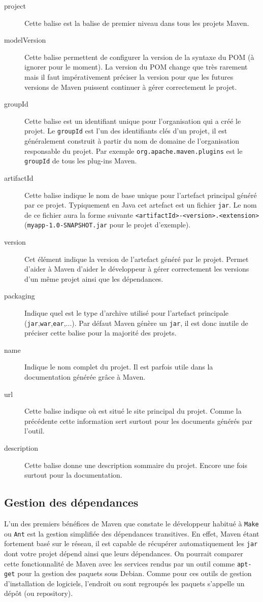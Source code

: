 \documentclass[a4paper,11pt]{article}
\begin{document}
\begin{description}
  \item[project] Cette balise est la balise de premier niveau dans tous les projets Maven.
  \item[modelVersion] Cette balise permettent de configurer la version de la syntaxe du POM (à ignorer pour le moment). 
  La version du POM change que très rarement mais il faut impérativement préciser la version pour que les futures versions
  de Maven puissent continuer à gérer correctement le projet.
  \item[groupId] Cette balise est un identifiant unique pour l'organisation qui a créé le projet. Le \texttt{groupId} est l'un 
  des identifiants clés d'un projet, il est généralement construit à partir du nom de domaine de l'organisation 
  responsable du projet. Par exemple \texttt{org.apache.maven.plugins} est le \texttt{groupId} de tous les plug-ins Maven.
  \item[artifactId] Cette balise indique le nom de base unique pour l'artefact principal généré par ce projet. 
  Typiquement en Java cet artefact est un fichier \texttt{jar}. Le nom de ce fichier aura la forme suivante 
  \texttt{<artifactId>-<version>.<extension>} (\texttt{myapp-1.0-SNAPSHOT.jar} pour le projet d'exemple).
  \item[version] Cet élément indique la version de l'artefact généré par le projet. Permet d'aider à Maven d'aider le 
  développeur à gérer correctement les versions d'un même projet ainsi que les dépendances.
  \item[packaging] Indique quel est le type d'archive utilisé pour l'artefact principale (\texttt{jar},\texttt{war},\texttt{ear},...). 
  Par défaut Maven génère un \texttt{jar}, il est donc inutile de préciser cette balise pour la majorité des projets.
  \item[name] Indique le nom complet du projet. Il est parfois utile dans la documentation générée grâce à Maven.
  \item[url] Cette balise indique où est situé le site principal du projet. Comme la précédente cette information sert 
  surtout pour les documents générés par l'outil.
  \item[description] Cette balise donne une description sommaire du projet. Encore une fois surtout pour la documentation.
\end{description}

\subsection{Gestion des dépendances}
L'un des premiers bénéfices de Maven que constate le développeur habitué à \texttt{Make} ou \texttt{Ant} est la gestion 
simplifiée des dépendances transitives. En effet, Maven étant fortement basé sur le réseau, il est capable de récupérer 
automatiquement les \texttt{jar} dont votre projet dépend ainsi que leurs dépendances. On pourrait comparer cette 
fonctionnalité de Maven avec les services rendus par un outil comme \texttt{apt-get} pour la gestion des paquets sous 
Debian. Comme pour ces outils de gestion d'installation de logiciels, l'endroit ou sont regroupés les paquets s'appelle 
un dépôt (ou repository). 
\end{document}
